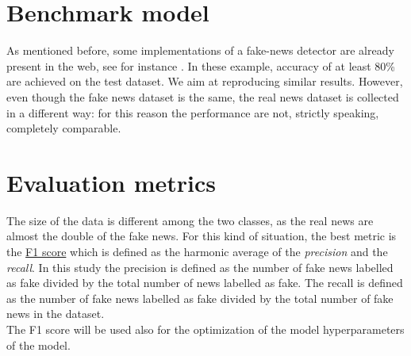 \documentclass[a4paper,12pt]{article} %
\begin{document}

\section{Benchmark model}
As mentioned before, some implementations of a fake-news detector are
already present in the web, see for instance \cite{Genes, NYDSA}. In
these example, accuracy of at least 80\% are achieved on the test
dataset. We aim at reproducing similar results. However, even though
the fake news dataset is the same, the real news dataset is collected
in a different way: for this reason the performance are not, strictly
speaking, completely comparable. 



\section{Evaluation metrics}
\label{sec:metrics}
The size of the data is different among the two classes, as the real
news are almost the double of the fake news. 
For this kind of situation, the best metric is the 
\href{https://en.wikipedia.org/wiki/F1_score}{F1 score} which is
defined as the harmonic average of the \textit{precision} and the
\textit{recall}. In this study the precision is defined as the number
of fake news labelled as fake divided by the total number of news
labelled as fake. The recall is defined as the number of fake news
labelled as fake divided by the total number of fake news in the
dataset. \\
The F1 score will be used also for the optimization of the model
hyperparameters of the model. 

\end{document}
